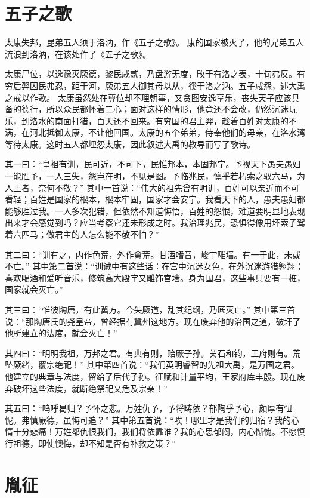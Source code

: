 \documentclass[12pt,UTF8]{ctexbook}
\begin{document}
\chapter{五子之歌}

太康失邦，昆弟五人须于洛汭，作《五子之歌》。
康的国家被灭了，他的兄弟五人流浪到洛汭，在该处作了《五子之歌》。

太康尸位，以逸豫灭厥德，黎民咸贰，乃盘游无度，畋于有洛之表，十旬弗反。有穷后羿因民弗忍，距于河，厥弟五人御其母以从，徯于洛之汭。五子咸怨，述大禹之戒以作歌。
太康虽然处在尊位却不理朝事，又贪图安逸享乐，丧失天子应该具备的德行，所以众民都怀着二心；面对这样的情形，他竟还不会改，仍然沉迷玩乐，到洛水的南面打猎，百天还不回来。有穷国的君主羿，趁着百姓对太康的不满，在河北抵御太康，不让他回国。太康的五个弟弟，侍奉他们的母亲，在洛水湾等待太康。这时五人都埋怨太康，因此叙述大禹的教导而写了歌诗。

其一曰：“皇祖有训，民可近，不可下，民惟邦本，本固邦宁。予视天下愚夫愚妇一能胜予，一人三失，怨岂在明，不见是图。予临兆民，懔乎若朽索之驭六马，为人上者，奈何不敬？”
其中一首说：“伟大的祖先曾有明训，百姓可以亲近而不可看轻；百姓是国家的根本，根本牢固，国家才会安宁。我看天下的人，愚夫愚妇都能够胜过我。一人多次犯错，但依然不知道悔悟，百姓的怨恨，难道要明显地表现出来才会感觉到吗？应当考察它还未形成之时。我治理兆民，恐惧得像用坏索子驾着六匹马；做君主的人怎么能不敬不怕？”

其二曰：“训有之，内作色荒，外作禽荒。甘酒嗜音，峻宇雕墙。有一于此，未或不亡。”
其中第二首说：“训诫中有这些话：在宫中沉迷女色，在外沉迷游猎翱翔；喜欢喝酒和爱听音乐，修筑高大殿宇又雕饰宫墙。身为国君，这些事只要有一桩，国家就会灭亡。”

其三曰：“惟彼陶唐，有此冀方。今失厥道，乱其纪纲，乃厎灭亡。”
其中第三首说：“那陶唐氏的尧皇帝，曾经据有冀州这地方。现在废弃他的治国之道，破坏了他所建立的法度，就会灭亡！”

其四曰：“明明我祖，万邦之君。有典有则，贻厥子孙。关石和钧，王府则有。荒坠厥绪，覆宗绝祀！”
其中第四首说：“我们英明睿智的先祖大禹，是万国之君。他建立的典章与法度，留给了后代子孙。征赋和计量平均，王家府库丰殷。现在废弃破坏这些法度，就断绝祭祀又危及宗亲！”

其五曰：“呜呼曷归？予怀之悲。万姓仇予，予将畴依？郁陶乎予心，颜厚有忸怩。弗慎厥德，虽悔可追？”
其中第五首说：“唉！哪里才是我们的归宿？我的心情十分悲痛！万姓都仇恨我们，我们将依靠谁？我的心思郁闷，内心惭愧。不愿慎行祖德，即使懊悔，却不知是否有补救之策？”

\chapter{胤征}
\end{document}
